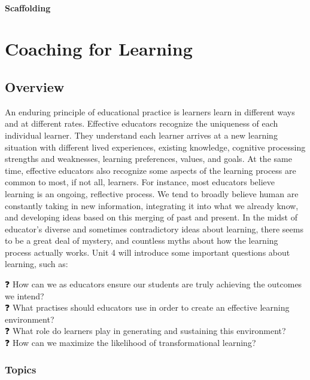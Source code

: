 \documentclass[
]{book}
\begin{document}
\hypertarget{scaffolding-1}{%
\subsubsection*{Scaffolding}\label{scaffolding-1}}

\hypertarget{coaching-for-learning}{%
\chapter{Coaching for Learning}\label{coaching-for-learning}}

\hypertarget{overview-2}{%
\section*{Overview}\label{overview-2}}

An enduring principle of educational practice is learners learn in different ways and at different rates. Effective educators recognize the uniqueness of each individual learner. They understand each learner arrives at a new learning situation with different lived experiences, existing knowledge, cognitive processing strengths and weaknesses, learning preferences, values, and goals. At the same time, effective educators also recognize some aspects of the learning process are common to most, if not all, learners. For instance, most educators believe learning is an ongoing, reflective process. We tend to broadly believe human are constantly taking in new information, integrating it into what we already know, and developing ideas based on this merging of past and present. In the midst of educator's diverse and sometimes contradictory ideas about learning, there seems to be a great deal of mystery, and countless myths about how the learning process actually works. Unit 4 will introduce some important questions about learning, such as:

❓ How can we as educators ensure our students are truly achieving the outcomes we intend?\\
❓ What practises should educators use in order to create an effective learning environment?\\
❓ What role do learners play in generating and sustaining this environment?\\
❓ How can we maximize the likelihood of transformational learning?

\hypertarget{topics-2}{%
\subsection*{Topics}\label{topics-2}}
\end{document}
